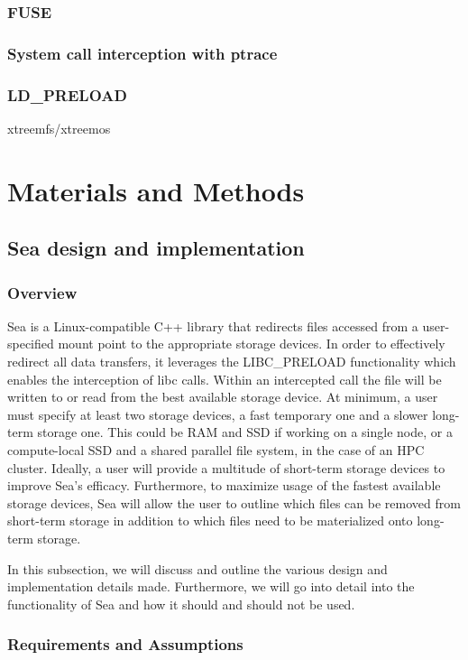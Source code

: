 \subsubsection{FUSE}
\subsubsection{System call interception with ptrace}
\subsubsection{LD\_PRELOAD}
xtreemfs/xtreemos

\section{Materials and Methods}

\subsection{Sea design and implementation}
\subsubsection{Overview}
Sea is a Linux-compatible C++ library that redirects files accessed from a user-specified mount point to the
appropriate storage devices. In order to effectively redirect all data transfers, it leverages the LIBC\_PRELOAD functionality which
enables the interception of libc calls. Within an intercepted call the file will be written to or read
from the best available storage device. At minimum, a user must specify at least two storage devices, a fast
temporary one and a slower long-term storage one. This could be RAM and SSD if working on a single node, or a compute-local SSD
and a shared parallel file system, in the case of an HPC cluster. Ideally, a user will provide a multitude of short-term storage
devices to improve Sea's efficacy. Furthermore, to maximize usage of the fastest available
storage devices, Sea will allow the user to outline which files can be removed from short-term storage in addition
to which files need to be materialized onto long-term storage.

In this subsection, we will discuss and outline the various design and implementation details made. Furthermore,
we will go into detail into the functionality of Sea and how it should and should not be used.

\subsubsection{Requirements and Assumptions}

